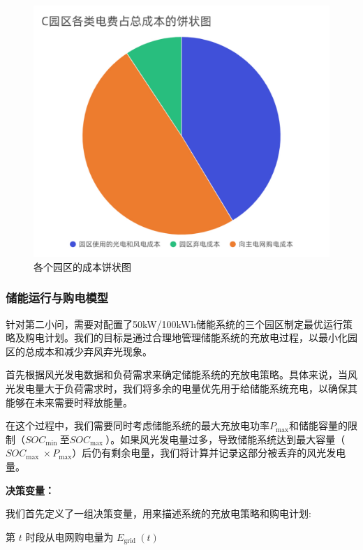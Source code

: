 \documentclass{cumcmthesis}
\begin{document}
\begin{figure}[!h]
\begin{minipage}{.5\textwidth}
  \includegraphics[width=.9\linewidth]{figures/C饼图.pdf}  
\end{minipage}  
\caption{各个园区的成本饼状图}  
\end{figure} 

\newpage




  \subsubsection{储能运行与购电模型}\label{ll}
针对第二小问，需要对配置了50kW/100kWh储能系统的三个园区制定最优运行策略及购电计划。我们的目标是通过合理地管理储能系统的充放电过程，以最小化园区的总成本和减少弃风弃光现象。

首先根据风光发电数据和负荷需求来确定储能系统的充放电策略。具体来说，当风光发电量大于负荷需求时，我们将多余的电量优先用于给储能系统充电，以确保其能够在未来需要时释放能量。

在这个过程中，我们需要同时考虑储能系统的最大充放电功率$P_{\text {max}}$和储能容量的限制（$S O C_{\text {min }}$至$S O C_{\text {max }}$）。如果风光发电量过多，导致储能系统达到最大容量（$S O C_{\text {max }} \times P_{\text {max}}$）后仍有剩余电量，我们将计算并记录这部分被丢弃的风光发电量。

\vspace{1cm}

\textbf{决策变量：}

我们首先定义了一组决策变量，用来描述系统的充放电策略和购电计划:

第 $t$ 时段从电网购电量为 $E_{\text {grid }}(t)$
\end{document}
